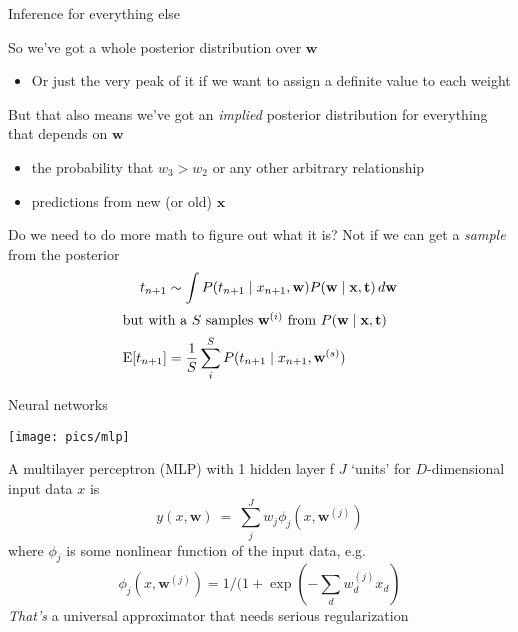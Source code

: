 \documentclass{hertieteaching}
\begin{document}
%
%
%
%
%
%

\begin{frame}{Inference for everything else}

So we've got a whole posterior distribution over $\mathbf{w}$
\begin{itemize}
  \item Or just the very peak of it if we want to assign a definite value to each weight
\end{itemize}

But that also means we've got an \textit{implied} posterior distribution for everything that depends on $\mathbf{w}$
\begin{itemize}
  \item the probability that $w_3 > w_2$ or any other arbitrary relationship
  \item predictions from new (or old) $\mathbf{x}$
\end{itemize}

Do we need to do more math to figure out what it is? Not if we can get a \textit{sample} from the posterior
\begin{align*}
t_{n+1} &\sim \int P(t_{n+1} \mid x_{n+1}, \mathbf{w}) P(\mathbf{w} \mid \mathbf{x}, \mathbf{t}) \,d\mathbf{w} \\
\intertext{but with a $S$ samples $\mathbf{w}^{(i)}$  from $P(\mathbf{w} \mid \mathbf{x}, \mathbf{t})$}
\text{E}[t_{n+1}] & = \frac{1}{S} \sum^{S}_i P(t_{n+1} \mid x_{n+1}, \mathbf{w}^{(s)}) 
\end{align*}

\end{frame}

\begin{frame}{Neural networks}

\centerline{\texttt{[image: pics/mlp]}}

A multilayer perceptron (MLP) with 1 hidden layer f $J$ `units' for $D$-dimensional input data $x$ is
$$
y(x, \textbf{w}) ~=~ \sum_j^J w_j \phi_j(x, \textbf{w}^{(j)})
$$
where $\phi_j$ is some nonlinear function of the input data, e.g.
$$
\phi_j(x, \textbf{w}^{(j)}) = 1/(1+\exp(-\sum_d w^{(j)}_{d} x_{d})
$$
\textit{That's} a universal approximator \parencite{Hornik.etal1989} that needs serious regularization

\end{frame}
\end{document}
